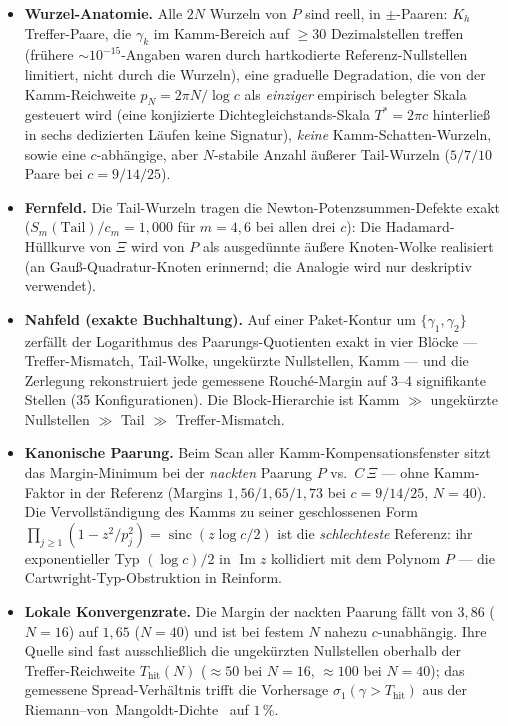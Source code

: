 \documentclass[12pt,a4paper]{article}
\theoremstyle{definition}
\theoremstyle{remark}
\begin{document}
\begin{itemize}
  \item \textbf{Wurzel-Anatomie.} Alle $2N$ Wurzeln von $P$ sind reell,
    in $\pm$-Paaren: $K_h$ Treffer-Paare, die $\gamma_k$ im Kamm-Bereich
    auf $\ge 30$ Dezimalstellen treffen (frühere
    $\sim\!10^{-15}$-Angaben waren durch hartkodierte Referenz-Nullstellen
    limitiert, nicht durch die Wurzeln), eine graduelle Degradation, die
    von der Kamm-Reichweite $p_N = 2\pi N/\log c$ als \emph{einziger}
    empirisch belegter Skala gesteuert wird (eine konjizierte
    Dichtegleichstands-Skala $T^* = 2\pi c$ hinterließ in sechs
    dedizierten Läufen keine Signatur), \emph{keine}
    Kamm-Schatten-Wurzeln, sowie eine $c$-abhängige, aber $N$-stabile
    Anzahl äußerer Tail-Wurzeln ($5/7/10$ Paare bei $c=9/14/25$).
  \item \textbf{Fernfeld.} Die Tail-Wurzeln tragen die
    Newton-Potenzsummen-Defekte exakt
    ($S_m(\text{Tail})/c_m = 1{,}000$ für $m=4,6$ bei allen drei $c$):
    Die Hadamard-Hüllkurve von $\Xi$ wird von $P$ als ausgedünnte äußere
    Knoten-Wolke realisiert (an Gauß-Quadratur-Knoten erinnernd; die
    Analogie wird nur deskriptiv verwendet).
  \item \textbf{Nahfeld (exakte Buchhaltung).} Auf einer Paket-Kontur um
    $\{\gamma_1,\gamma_2\}$ zerfällt der Logarithmus des
    Paarungs-Quotienten exakt in vier Blöcke --- Treffer-Mismatch,
    Tail-Wolke, ungekürzte Nullstellen, Kamm --- und die Zerlegung
    rekonstruiert jede gemessene Rouch\'e-Margin auf 3--4 signifikante
    Stellen (35 Konfigurationen). Die Block-Hierarchie ist
    Kamm $\gg$ ungekürzte Nullstellen $\gg$ Tail $\gg$ Treffer-Mismatch.
  \item \textbf{Kanonische Paarung.} Beim Scan aller
    Kamm-Kompensationsfenster sitzt das Margin-Minimum bei der
    \emph{nackten} Paarung $P$ vs.\ $C\,\Xi$ --- ohne Kamm-Faktor in der
    Referenz (Margins $1{,}56/1{,}65/1{,}73$ bei $c=9/14/25$, $N=40$).
    Die Vervollständigung des Kamms zu seiner geschlossenen Form
    $\prod_{j\ge 1}(1-z^2/p_j^2) = \operatorname{sinc}(z\log c/2)$ ist
    die \emph{schlechteste} Referenz: ihr exponentieller Typ
    $(\log c)/2$ in $\operatorname{Im} z$ kollidiert mit dem Polynom $P$
    --- die Cartwright-Typ-Obstruktion in Reinform.
  \item \textbf{Lokale Konvergenzrate.} Die Margin der nackten Paarung
    fällt von $3{,}86$ ($N=16$) auf $1{,}65$ ($N=40$) und ist bei festem
    $N$ nahezu $c$-unabhängig. Ihre Quelle sind fast ausschließlich die
    ungekürzten Nullstellen oberhalb der Treffer-Reichweite
    $T_{\mathrm{hit}}(N)$ ($\approx 50$ bei $N=16$, $\approx 100$ bei
    $N=40$); das gemessene Spread-Verhältnis trifft die Vorhersage
    $\sigma_1(\gamma > T_{\mathrm{hit}})$ aus der
    Riemann--von~Mangoldt-Dichte~\cite{Titchmarsh1986} auf $1\,\%$.
\end{itemize}
\end{document}
